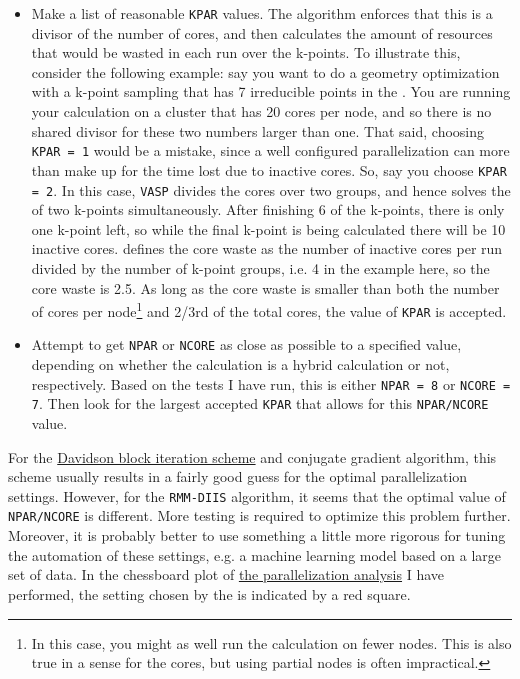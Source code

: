 \begin{refsection}
\begin{itemize}

\item Make a list of reasonable \texttt{KPAR} values. The algorithm enforces that this is a divisor of the number of cores, and then calculates the amount of resources that would be wasted in each run over the k-points. To illustrate this, consider the following example: say you want to do a geometry optimization with a k-point sampling that has 7 irreducible points in the . You are running your calculation on a cluster that has 20 cores per node, and so there is no shared divisor for these two numbers larger than one. That said, choosing \texttt{KPAR = 1} would be a mistake, since a well configured parallelization can more than make up for the time lost due to inactive cores. So, say you choose \texttt{KPAR = 2}. In this case, \texttt{VASP} divides the cores over two groups, and hence solves the  of two k-points simultaneously. After finishing 6 of the k-points, there is only one k-point left, so while the final k-point is being calculated there will be 10 inactive cores.  defines the core waste as the number of inactive cores per run divided by the number of k-point groups, i.e. 4 in the example here, so the core waste is 2.5. As long as the core waste is smaller than both the number of cores per node\footnote{In this case, you might as well run the calculation on fewer nodes. This is also true in a sense for the cores, but using partial nodes is often impractical.} and 2/3rd of the total cores, the value of \texttt{KPAR} is accepted.

\item Attempt to get \texttt{NPAR} or \texttt{NCORE} as close as possible to a specified value, depending on whether the calculation is a hybrid calculation or not, respectively. Based on the tests I have run, this is either \texttt{NPAR = 8} or \texttt{NCORE = 7}. Then look for the largest accepted \texttt{KPAR} that allows for this \texttt{NPAR/NCORE} value.

\end{itemize}

For the \href{https://joshuagoings.com/2013/08/23/davidsons-method/}{Davidson block iteration scheme} and conjugate gradient algorithm, this scheme usually results in a fairly good guess for the optimal parallelization settings. However, for the \texttt{RMM-DIIS} algorithm, it seems that the optimal value of \texttt{NPAR/NCORE} is different. More testing is required to optimize this problem further. Moreover, it is probably better to use something a little more rigorous for tuning the automation of these settings, e.g. a machine learning model based on a large set of data. In the chessboard plot of \href{https://mybinder.org/v2/gh/mbercx/jupyter/master?filepath=parallel\%2Fparallel_analysis.ipynb}{the parallelization analysis} I have performed, the setting chosen by the  is indicated by a red square.


\end{refsection}

